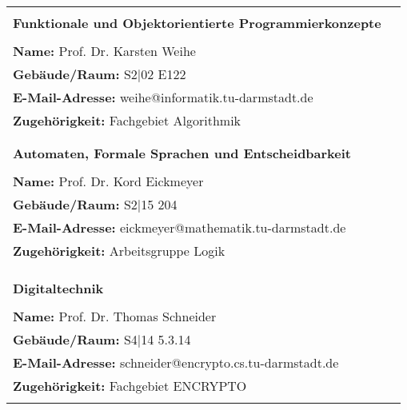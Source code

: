 \begin{tabular}{lc}

                                                                   &                   \\
    \textbf{Funktionale und Objektorientierte Programmierkonzepte}
    & \multirow{4}{*}{} \\
                                                                   &                   \\
    \textbf{Name:} Prof. Dr. Karsten Weihe                         &                   \\
    \textbf{Gebäude/Raum:} S2$|$02 E122                            &                   \\
    \textbf{E-Mail-Adresse:} weihe@informatik.tu-darmstadt.de      &                   \\
    \textbf{Zugehörigkeit:} Fachgebiet Algorithmik                 &                   \\

                                                                   & \\&               \\
    \textbf{Automaten, Formale Sprachen und Entscheidbarkeit}
    & \multirow{4}{*}{} \\
                                                                   &                   \\
    \textbf{Name:} Prof. Dr. Kord Eickmeyer                        &                   \\
    \textbf{Gebäude/Raum:} S2$|$15 204                             &                   \\
    \textbf{E-Mail-Adresse:} eickmeyer@mathematik.tu-darmstadt.de  &                   \\
    \textbf{Zugehörigkeit:} Arbeitsgruppe Logik                    &                   \\
                                                                   &                   \\

                                                                   & \\&               \\
    \textbf{Digitaltechnik}
    & \multirow{4}{*}{} \\
                                                                   &                   \\
    \textbf{Name:} Prof. Dr. Thomas Schneider                      &                   \\
    \textbf{Gebäude/Raum:} S4$|$14 5.3.14                          &                   \\
    \textbf{E-Mail-Adresse:} schneider@encrypto.cs.tu-darmstadt.de &                   \\
    \textbf{Zugehörigkeit:} Fachgebiet ENCRYPTO                    &                   \\
                                                                   &                   \\


\end{tabular}
